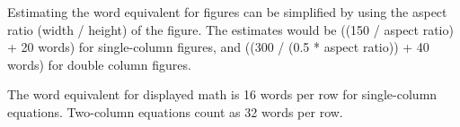 \documentclass[%
 reprint,
superscriptaddress,
showpacs,preprintnumbers,
 amsmath,amssymb,
 aps,
 prl,
]{revtex4-1}
\begin{document}
Estimating the word equivalent for figures can be simplified by using the aspect
ratio (width / height) of the figure. The estimates would be ((150 / aspect
ratio) + 20 words) for single-column figures, and ((300 / (0.5 * aspect ratio))
+ 40 words) for double column figures.

The word equivalent for displayed math is 16 words per row for single-column
equations. Two-column equations count as 32 words per row.






\end{document}
